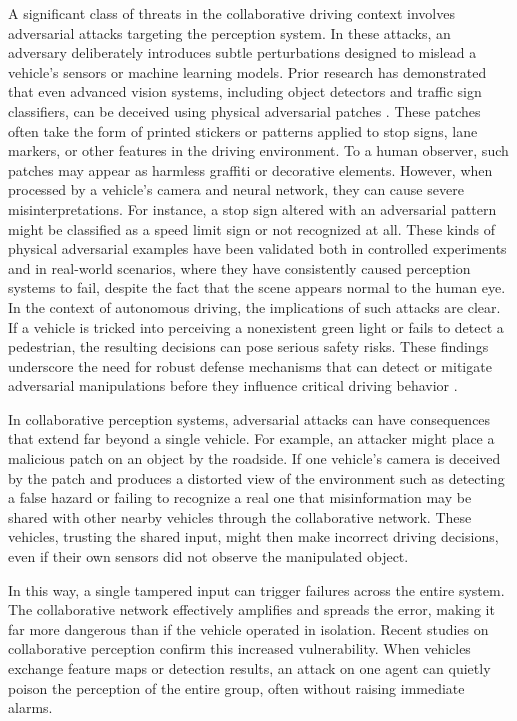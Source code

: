 A significant class of threats in the collaborative driving context involves adversarial attacks targeting the perception system. In these attacks, an adversary deliberately introduces subtle perturbations designed to mislead a vehicle’s sensors or machine learning models.
Prior research has demonstrated that even advanced vision systems, including object detectors and traffic sign classifiers, can be deceived using physical adversarial patches \cite{pmlr-v80-athalye18b} \cite{brown2018adversarialpatch} \cite{Chen_2019} \cite{goodfellow2015explainingharnessingadversarialexamples} \cite{szegedy2014intriguingpropertiesneuralnetworks} \cite{10.11453319535.3354259}.
These patches often take the form of printed stickers or patterns applied to stop signs, lane markers, or other features in the driving environment.
To a human observer, such patches may appear as harmless graffiti or decorative elements. However, when processed by a vehicle’s camera and neural network, they can cause severe misinterpretations.
For instance, a stop sign altered with an adversarial pattern might be classified as a speed limit sign or not recognized at all.
These kinds of physical adversarial examples have been validated both in controlled experiments and in real-world scenarios, where they have consistently caused perception systems to fail, despite the fact that the scene appears normal to the human eye.
In the context of autonomous driving, the implications of such attacks are clear. If a vehicle is tricked into perceiving a nonexistent green light or fails to detect a pedestrian, the resulting decisions can pose serious safety risks. These findings underscore the need for robust defense mechanisms that can detect or mitigate adversarial manipulations before they influence critical driving behavior \cite{zhu2023tpatchtriggeredphysicaladversarial}.

In collaborative perception systems, adversarial attacks can have consequences that extend far beyond a single vehicle. For example, an attacker might place a malicious patch on an object by the roadside. If one vehicle’s camera is deceived by the patch and produces a distorted view of the environment such as detecting a false hazard or failing to recognize a real one that misinformation may be shared with other nearby vehicles through the collaborative network. These vehicles, trusting the shared input, might then make incorrect driving decisions, even if their own sensors did not observe the manipulated object.

In this way, a single tampered input can trigger failures across the entire system. The collaborative network effectively amplifies and spreads the error, making it far more dangerous than if the vehicle operated in isolation. Recent studies on collaborative perception confirm this increased vulnerability. \cite{10.1007978-3-030-58536-5_36} \cite{96294f63afd44ccd9210824e1aa2656c} \cite{hu2022where2commcommunicationefficientcollaborativeperception} \cite{6a619c52e2df4c96ac051544a08e266d} When vehicles exchange feature maps or detection results, an attack on one agent can quietly poison the perception of the entire group, often without raising immediate alarms.

